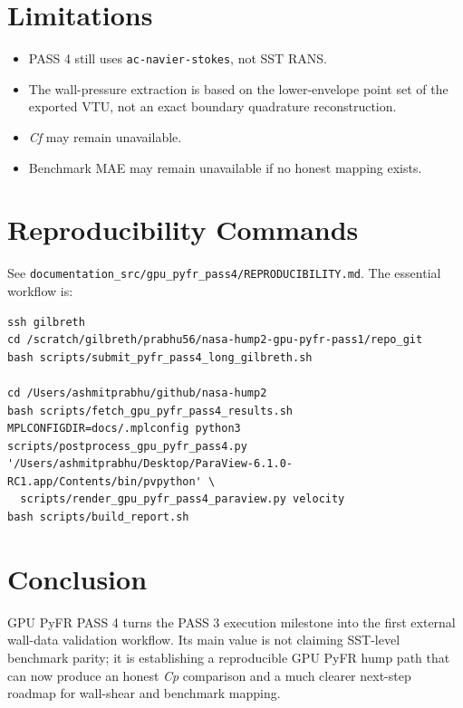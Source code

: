 \documentclass[11pt]{article}
\begin{document}
\section{Limitations}
\begin{itemize}
  \item PASS 4 still uses \texttt{ac-navier-stokes}, not SST RANS.
  \item The wall-pressure extraction is based on the lower-envelope point set of the exported VTU, not an exact boundary quadrature reconstruction.
  \item \textit{Cf} may remain unavailable.
  \item Benchmark MAE may remain unavailable if no honest mapping exists.
\end{itemize}

\section{Reproducibility Commands}
See \texttt{documentation\_src/gpu\_pyfr\_pass4/REPRODUCIBILITY.md}. The essential workflow is:
\begin{lstlisting}[basicstyle=\ttfamily\small,breaklines=true]
ssh gilbreth
cd /scratch/gilbreth/prabhu56/nasa-hump2-gpu-pyfr-pass1/repo_git
bash scripts/submit_pyfr_pass4_long_gilbreth.sh

cd /Users/ashmitprabhu/github/nasa-hump2
bash scripts/fetch_gpu_pyfr_pass4_results.sh
MPLCONFIGDIR=docs/.mplconfig python3 scripts/postprocess_gpu_pyfr_pass4.py
'/Users/ashmitprabhu/Desktop/ParaView-6.1.0-RC1.app/Contents/bin/pvpython' \
  scripts/render_gpu_pyfr_pass4_paraview.py velocity
bash scripts/build_report.sh
\end{lstlisting}

\section{Conclusion}
GPU PyFR PASS 4 turns the PASS 3 execution milestone into the first external wall-data validation workflow. Its main value is not claiming SST-level benchmark parity; it is establishing a reproducible GPU PyFR hump path that can now produce an honest \textit{Cp} comparison and a much clearer next-step roadmap for wall-shear and benchmark mapping.



\end{document}
